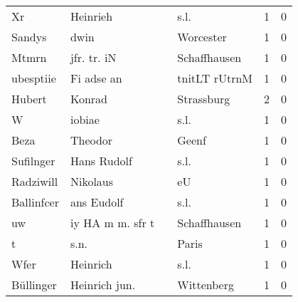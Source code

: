 \begin{tabular}{llllrr}
                       Xr &                           Heinrieh &             &                                        s.l. &          1 &         0 \\
                   Sandys &                               dwin &             &                                   Worcester &          1 &         0 \\
                    Mtmrn &                        jfr. tr. iN &             &                                Schaffhausen &          1 &         0 \\
                ubesptiie &                         Fi adse an &             &                               tnitLT rUtrnM &          1 &         0 \\
                   Hubert &                             Konrad &             &                                  Strassburg &          2 &         0 \\
                        W &                             iobiae &             &                                        s.l. &          1 &         0 \\
                     Beza &                            Theodor &             &                                       Geenf &          1 &         0 \\
                Sufilnger &                        Hans Rudolf &             &                                        s.l. &          1 &         0 \\
                Radziwill &                           Nikolaus &             &                                          eU &          1 &         0 \\
               Ballinfcer &                         ans Eudolf &             &                                        s.l. &          1 &         0 \\
                       uw &                   iy HA m m. sfr t &             &                                Schaffhausen &          1 &         0 \\
                        t &                               s.n. &             &                                       Paris &          1 &         0 \\
                     Wfer &                           Heinrich &             &                                        s.l. &          1 &         0 \\
                Büllinger &                      Heinrich jun. &             &                                  Wittenberg &          1 &         0 \\

\end{tabular}
